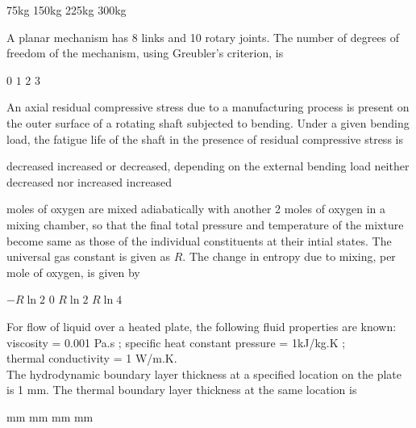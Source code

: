 \documentclass[addpoints,10pt]{exam}
\begin{document}
\begin{questions}
    \begin{oneparchoices}
        \choice 75kg
        \choice 150kg
        \choice 225kg
        \choice 300kg
    \end{oneparchoices}

    \question A planar mechanism has 8 links and 10 rotary joints. The number of degrees of freedom of the mechanism, using Greubler's criterion, is

    \begin{oneparchoices}
        \choice $0$
        \choice $1$
        \choice $2$
        \choice $3$
    \end{oneparchoices}

    \question An axial residual compressive stress due to a manufacturing process is present on the outer surface of a rotating shaft subjected to bending. Under a given bending load, the fatigue life of the shaft in the presence of residual compressive stress is

    \begin{choices}
        \choice decreased
        \choice increased or decreased, depending on the external bending load
        \choice neither decreased nor increased
        \choice increased
    \end{choices}

     moles of oxygen are mixed adiabatically with another 2 moles of oxygen in a mixing chamber, so that the final total pressure and temperature of the mixture become same as those of the individual constituents at their intial states. The universal gas constant is given as $R$. The change in entropy due to mixing, per mole of oxygen, is given by

    \begin{oneparchoices}
        \choice $-R \ln2$
        \choice $0$
        \choice $R \ln 2$
        \choice $R\ln4$
    \end{oneparchoices}

    \question For flow of liquid over a heated plate, the following fluid properties are known:\\
    viscosity = 0.001 Pa.s ; specific heat constant pressure = 1kJ/kg.K ;\\
    thermal conductivity = 1 W/m.K.\\
    The hydrodynamic boundary layer thickness at a specified location on the plate is 1 mm. The thermal boundary layer thickness at the same location is

    \begin{oneparchoices}
         mm
         mm
         mm
         mm
    \end{oneparchoices}


\end{questions}
\end{document}
